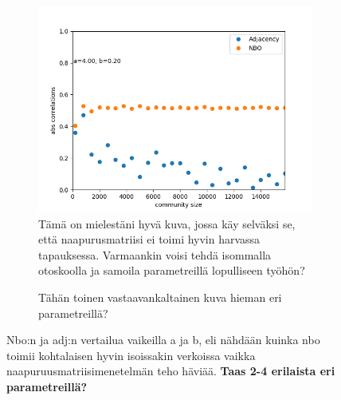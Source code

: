 \documentclass[finnish,12pt,a4paper,pdftex,sci,utf8]{aaltothesis}
\begin{document}
\begin{figure}
	\label{fig:adj_nbo_sp_hard}
	\centering
	\begin{subfigure}[b]{0.4 \textwidth}
		\includegraphics[width = \textwidth]{adj_nbo_hard.png}
		\caption{Tämä on mielestäni hyvä kuva, jossa käy selväksi se, että naapurusmatriisi ei toimi hyvin harvassa tapauksessa. Varmaankin voisi tehdä isommalla otoskoolla ja samoila parametreillä lopulliseen työhön?}
	\end{subfigure}
	\begin{subfigure}[b]{0.4 \textwidth}
		\caption{Tähän toinen vastaavankaltainen kuva hieman eri parametreillä? }
	\end{subfigure}
	\caption{Nbo:n ja adj:n vertailua vaikeilla a ja b, eli nähdään kuinka nbo toimii kohtalaisen hyvin isoissakin verkoissa vaikka naapuruusmatriisimenetelmän teho häviää. \textbf{Taas 2-4 erilaista eri parametreillä?}}
\end{figure}
\end{document}
